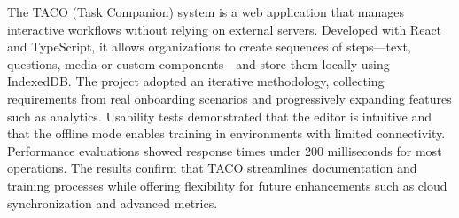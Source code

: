 The TACO (Task Companion) system is a web application that manages interactive workflows without relying on external servers. Developed with React and TypeScript, it allows organizations to create sequences of steps—text, questions, media or custom components—and store them locally using IndexedDB. The project adopted an iterative methodology, collecting requirements from real onboarding scenarios and progressively expanding features such as analytics. Usability tests demonstrated that the editor is intuitive and that the offline mode enables training in environments with limited connectivity. Performance evaluations showed response times under 200 milliseconds for most operations. The results confirm that TACO streamlines documentation and training processes while offering flexibility for future enhancements such as cloud synchronization and advanced metrics.
